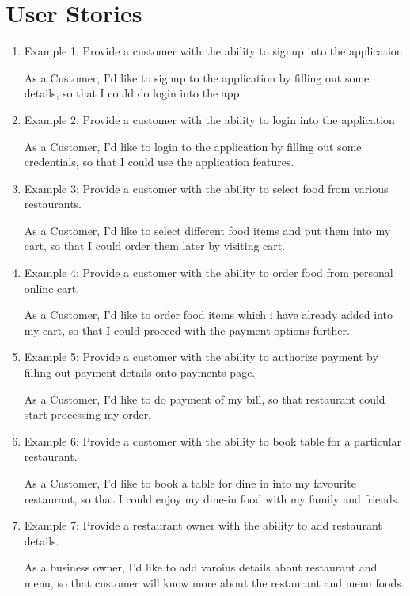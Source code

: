 \documentclass[12pt]{article}
\begin{document}
\section{User Stories}\label{User Stories}

\begin{enumerate}
    \item Example 1: Provide a customer with the ability to signup into the application
   
   As a Customer, I’d like to signup to the application by filling out some details, so that I could do login into the app.

     \item Example 2: Provide a customer with the ability to login into the application
   
   As a Customer, I’d like to login to the application by filling out some credentials, so that I could use the application features. 
   
   \item Example 3: Provide a customer with the ability to select food from various restaurants.
   
   As a Customer, I’d like to select different food items and put them into my cart, so that I could order them later by visiting cart. 
   
    \item Example 4: Provide a customer with the ability to order food from personal online cart.
   
   As a Customer, I’d like to order food items which i have already added into my cart, so that I could proceed with the payment options further.
    \item Example 5: Provide a customer with the ability to authorize payment by filling out payment details  onto payments page.
   
   As a Customer, I’d like to do payment of my bill, so that restaurant could start processing my order. 
   
    \item Example 6: Provide a customer with the ability to book table for a particular restaurant.
   
   As a Customer, I’d like to book a table for dine in into my favourite restaurant, so that I could enjoy my dine-in food with my family and friends. 
   
    \item Example 7: Provide a restaurant owner with the ability to add restaurant details.
   
   As a business owner, I’d like to add varoius details about restaurant and menu, so that customer will know more about the restaurant and menu foods. 
\end{enumerate}



\end{document}
